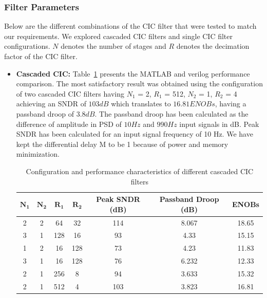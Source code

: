 \documentclass[11pt,onecolumn]{IEEEtran}
\begin{document}
\subsubsection{Filter Parameters}
Below are the different combinations of the CIC filter that were tested to match our requirements. We explored cascaded CIC filters and single CIC filter configurations. $N$ denotes the number of stages and $R$ denotes the decimation factor of the CIC filter.
\begin{itemize}
    \item \textbf{Cascaded CIC:} Table~\ref{tab:ccic_sndr_comparison} presents the MATLAB and verilog performance comparison. The most satisfactory result was obtained using the configuration of two cascaded CIC filters having \(N_1\) = 2, \(R_1\) = 512, \(N_2\) = 1, \newline \(R_2\) = 4 achieving an SNDR of $103dB$ which translates to $16.81 ENOBs$, having a passband droop of $3.8dB$. The passband droop has been calculated as the difference of amplitude in PSD of $10Hz$ and $990Hz$ input signals in dB. Peak SNDR has been calculated for an input signal frequency of 10 Hz. We have kept the differential delay M to be 1 because of power and memory minimization.
        \begin{table}[h!]
        \centering
        \begin{tabular}{|c|c|c|c|c|c|c|}
        \hline
        \(\mathbf{N_1}\) & \(\mathbf{N_2}\) & \(\mathbf{R_1}\) & \(\mathbf{R_2}\) &
    \textbf{Peak SNDR (dB)} & \textbf{Passband Droop (dB)} & \textbf{ENOBs} \\ \hline

        2 & 2 & 64  & 32  & 114 & 8.067  & 18.65 \\ \hline
        3 & 1 & 128 & 16  & 93  & 4.33   & 15.15 \\ \hline
        1 & 2 & 16  & 128 & 73  & 4.23   & 11.83 \\ \hline
        3 & 1 & 16  & 128 & 76  & 6.232  & 12.33 \\ \hline
        2 & 1 & 256 & 8   & 94  & 3.633  & 15.32 \\ \hline
        2 & 1 & 512 & 4   & 103 & 3.823  & 16.81 \\ \hline
        \end{tabular}
        \caption{Configuration and performance characteristics of different cascaded CIC filters}
        \label{tab:ccic_sndr_comparison}
        \end{table}
        

\end{itemize}
\end{document}
